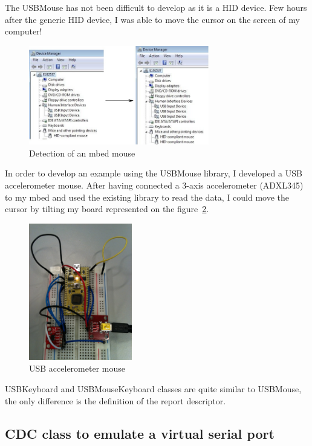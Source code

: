 \documentclass[pdftex,10pt,a4paper]{report}
\begin{document}
The USBMouse has not been difficult to develop as it is a HID device. Few hours after the generic HID device, I was able to move the cursor on the screen of my computer!

\begin{figure}[h!]
		\centering
		\includegraphics[width=0.7\textwidth]{./mouse_dev_manager.jpg}
		\caption{Detection of an mbed mouse}
		\label{Detection of an mbed mouse}
\end{figure}

In order to develop an example using the USBMouse library, I developed a USB accelerometer mouse. After having connected a 3-axis accelerometer (ADXL345) to my mbed and used the existing library to read the data, I could move the cursor by tilting my board represented on the figure~\ref{USB accelerometer mouse}.

\begin{figure}[h!]
		\centering
		\includegraphics[width=0.4\textwidth]{./usb_acc_mouse.jpg}
		\caption{USB accelerometer mouse}
		\label{USB accelerometer mouse}
\end{figure}

USBKeyboard and USBMouseKeyboard classes are quite similar to USBMouse, the only difference is the definition of the report descriptor. 


\subsection{CDC class to emulate a virtual serial port}
\end{document}
